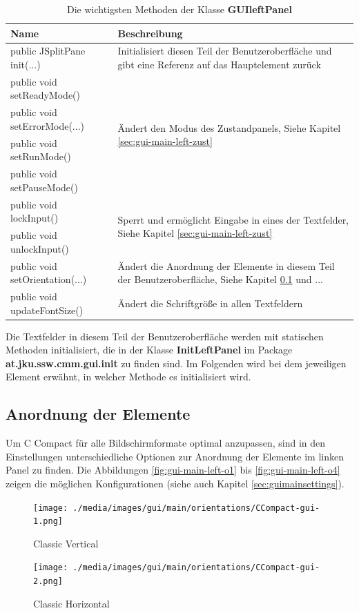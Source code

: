 \def\arraystretch{1.6}
\begin{table}
\begin{tabularx}{\columnwidth}{l|p{9cm}}
\textbf{Name}&\textbf{Beschreibung}\\
\hline
\hline
public JSplitPane init(...)&Initialisiert diesen Teil der Benutzeroberfläche und gibt eine Referenz auf das Hauptelement zurück\\
\hline
public void setReadyMode()&\multirow{4}{*}{\parbox{9cm}{Ändert den Modus des Zustandpanels, Siehe Kapitel \ref{sec:gui-main-left-zust}}}\\
public void setErrorMode(...)&\\
public void setRunMode()&\\
public void setPauseMode()&\\
\hline
public void lockInput()&\multirow{2}{*}{\parbox{9cm}{Sperrt und ermöglicht Eingabe in eines der Textfelder, Siehe Kapitel \ref{sec:gui-main-left-zust}}}\\
public void unlockInput()&\\
\hline
public void setOrientation(...)&Ändert die Anordnung der Elemente in diesem Teil der Benutzeroberfläche, Siehe Kapitel \ref{sec:gui-main-left-ord} und ...\\
\hline
public void updateFontSize()&Ändert die Schriftgröße in allen Textfeldern
\end{tabularx}
\caption{Die wichtigsten Methoden der Klasse \textbf{GUIleftPanel}}\label{tab:gui-main-left-methods}
\end{table}

Die Textfelder in diesem Teil der Benutzeroberfläche werden mit statischen Methoden initialisiert, die in der Klasse \textbf{InitLeftPanel} im Package \textbf{at.jku.ssw.cmm.gui.init} zu finden sind. Im Folgenden wird bei dem jeweiligen Element erwähnt, in welcher Methode es initialisiert wird.

\subsection{Anordnung der Elemente}
\label{sec:gui-main-left-ord}

Um C Compact für alle Bildschirmformate optimal anzupassen, sind in den Einstellungen unterschiedliche Optionen zur Anordnung der Elemente im linken Panel zu finden. Die Abbildungen \ref{fig:gui-main-left-o1} bis \ref{fig:gui-main-left-o4} zeigen die möglichen Konfigurationen (siehe auch Kapitel \ref{sec:guimainsettings}).

\begin{figure}
\centering
	\begin{minipage}{0.45\textwidth}
		\centering
		\texttt{[image: ./media/images/gui/main/orientations/CCompact-gui-1.png]}
		\caption{Classic Vertical}\label{fig:gui-main-left-o1}
	\end{minipage}\hfill
	\begin{minipage}{0.45\textwidth}
		\centering
		\texttt{[image: ./media/images/gui/main/orientations/CCompact-gui-2.png]}
		\caption{Classic Horizontal}\label{fig:gui-main-left-o2}
	\end{minipage}
\end{figure}

